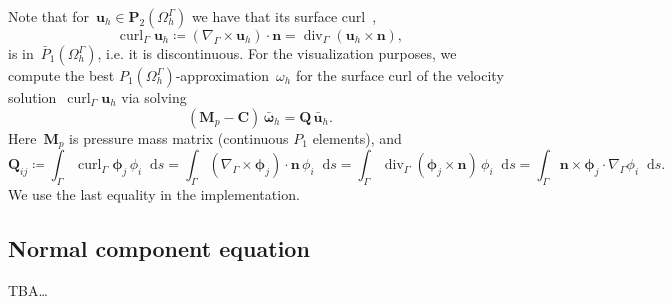 \documentclass[12pt]{article}
\newcommand{\vect}[1]{\boldsymbol{\mathbf{#1}}}
\newcommand*\diff{\mathop{}\!\mathrm{d}}
\DeclareMathOperator{\Div}{div}
\DeclareMathOperator{\Curl}{curl}
\begin{document}
Note that for~$\vect u_h \in \vect P_2(\Omega^\Gamma_h)$ we have that its surface curl~\cite{10.1093/imanum/dry062},
$$
	\Curl_\Gamma \vect u_h \coloneqq (\nabla_\Gamma\times\vect u_h)\cdot \vect n = \Div_\Gamma(\vect u_h\times\vect n),
$$
is in~$\bar P_1(\Omega^\Gamma_h)$, i.e. it is discontinuous. For the visualization purposes, we compute the best $P_1(\Omega^\Gamma_h)$-approximation~$\omega_h$ for the surface curl of the velocity solution~$\Curl_\Gamma \vect u_h$ via solving
$$
	(\vect M_p - \vect C)\,\bar{\vect\omega}_h = \vect Q\,\bar{\vect u}_h.
$$
Here~$\vect M_p$ is pressure mass matrix (continuous $P_1$ elements), and
$$
	\vect Q_{ij} \coloneqq \int_\Gamma \Curl_\Gamma\vect\phi_j\,\phi_i\diff{s} = \int_\Gamma (\nabla_\Gamma\times\vect\phi_j)\cdot \vect n\,\phi_i\diff{s} = \int_\Gamma \Div_\Gamma(\vect\phi_j\times\vect n)\,\phi_i\diff{s}
	= \int_\Gamma \vect n\times\vect\phi_j\cdot\nabla_\Gamma\phi_i\diff{s}.
$$
We use the last equality in the implementation.

\subsection{Normal component equation}

TBA\dots
\end{document}
